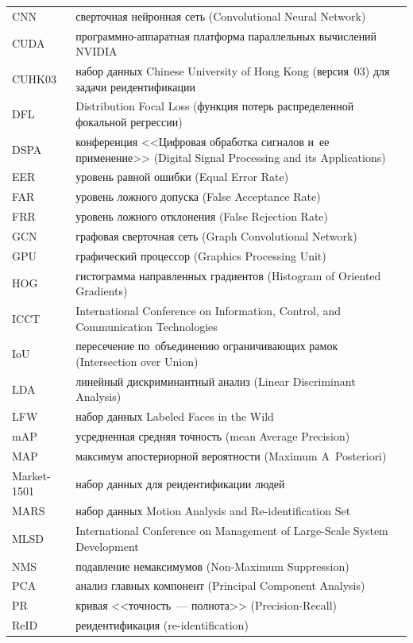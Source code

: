 \begin{longtable}{@{}p{}p{}@{}}
CNN     & сверточная нейронная сеть (Convolutional Neural Network)\\
CUDA    & программно-аппаратная платформа параллельных вычислений NVIDIA\\
CUHK03  & набор данных Chinese University of Hong Kong (версия~03) для задачи реидентификации\\
DFL     & Distribution Focal Loss (функция потерь распределенной фокальной регрессии)\\
DSPA    & конференция <<Цифровая обработка сигналов и~ее применение>> (Digital Signal Processing and its Applications)\\
EER     & уровень равной ошибки (Equal Error Rate)\\
FAR     & уровень ложного допуска (False Acceptance Rate)\\
FRR     & уровень ложного отклонения (False Rejection Rate)\\
GCN     & графовая сверточная сеть (Graph Convolutional Network)\\
GPU     & графический процессор (Graphics Processing Unit)\\
HOG     & гистограмма направленных градиентов (Histogram of Oriented Gradients)\\
ICCT    & International Conference on Information, Control, and Communication Technologies\\
IoU     & пересечение по~объединению ограничивающих рамок (Intersection over Union)\\
LDA     & линейный дискриминантный анализ (Linear Discriminant Analysis)\\
LFW     & набор данных Labeled Faces in the Wild\\
mAP     & усредненная средняя точность (mean Average Precision)\\
MAP     & максимум апостериорной вероятности (Maximum A~Posteriori)\\
Market-1501 & набор данных для реидентификации людей\\
MARS    & набор данных Motion Analysis and Re-identification Set\\
MLSD    & International Conference on Management of Large-Scale System Development\\
NMS     & подавление немаксимумов (Non-Maximum Suppression)\\
PCA     & анализ главных компонент (Principal Component Analysis)\\
PR      & кривая <<точность~--- полнота>> (Precision-Recall)\\
ReID    & реидентификация (re-identification)\\

\end{longtable}
